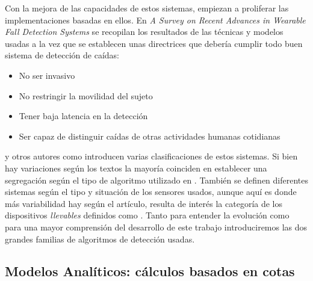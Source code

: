 Con la mejora de las capacidades de estos sistemas, empiezan a proliferar las implementaciones basadas en ellos. En \textit{A Survey on Recent Advances in Wearable Fall Detection Systems}\cite{Anita2020} se recopilan los resultados de las técnicas y modelos usadas a la vez que se establecen unas directrices que debería cumplir todo buen sistema de detección de caídas:
\begin{itemize}
  \item No ser invasivo
  \item No restringir la movilidad del sujeto
  \item Tener baja latencia en la detección
  \item Ser capaz de distinguir caídas de otras actividades humanas cotidianas
\end{itemize}
 y otros autores como  introducen varias clasificaciones de estos sistemas. Si bien hay variaciones según los textos la mayoría coinciden en establecer una segregación según el tipo de algoritmo utilizado en . También se definen diferentes sistemas según el tipo y situación de los sensores usados, aunque aquí es donde más variabilidad hay según el artículo, resulta de interés la categoría de los dispositivos \textit{llevables} definidos como . Tanto para entender la evolución como para una mayor comprensión del desarrollo de este trabajo introduciremos las dos grandes familias de algoritmos de detección usadas.

\subsection{Modelos Analíticos: cálculos basados en cotas}\label{sec:arte:modelos_analiticos}

